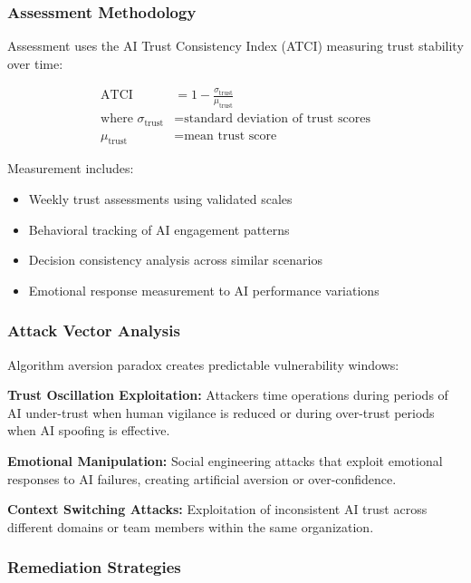\documentclass[11pt,a4paper]{article}
\begin{document}
\subsubsection{Assessment Methodology}

Assessment uses the AI Trust Consistency Index (ATCI) measuring trust stability over time:

\begin{align}
\text{ATCI} &= 1 - \frac{\sigma_{\text{trust}}}{\mu_{\text{trust}}} \\
\text{where } \sigma_{\text{trust}} &= \text{standard deviation of trust scores} \\
\mu_{\text{trust}} &= \text{mean trust score}
\end{align}

Measurement includes:
\begin{itemize}
\item Weekly trust assessments using validated scales
\item Behavioral tracking of AI engagement patterns
\item Decision consistency analysis across similar scenarios
\item Emotional response measurement to AI performance variations
\end{itemize}

\subsubsection{Attack Vector Analysis}

Algorithm aversion paradox creates predictable vulnerability windows:

\textbf{Trust Oscillation Exploitation:} Attackers time operations during periods of AI under-trust when human vigilance is reduced or during over-trust periods when AI spoofing is effective\cite{oscillation2024}.

\textbf{Emotional Manipulation:} Social engineering attacks that exploit emotional responses to AI failures, creating artificial aversion or over-confidence\cite{emotional2023}.

\textbf{Context Switching Attacks:} Exploitation of inconsistent AI trust across different domains or team members within the same organization\cite{context2024}.

\subsubsection{Remediation Strategies}
\end{document}
